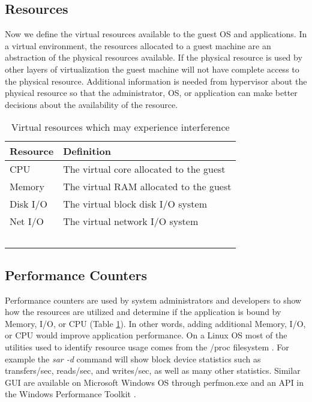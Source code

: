 \subsection{Resources}
Now we define the virtual resources available to the guest OS and applications.
In a virtual environment, the resources allocated to a guest machine are an abstraction of the physical resources available.  
If the physical resource is used by other layers of virtualization the guest machine will not have complete access to the physical resource.    
Additional information is needed from hypervisor about the physical resource so that the administrator, OS, or application can make better decisions about the availability of the resource. 

\begin{table}[h]
  \begin{tabular}{ l p{10cm} }
    Resource & Definition \\
    \hline
    CPU & The virtual core allocated to the guest \\
    Memory & The virtual RAM allocated to the guest \\
    Disk I/O & The virtual block disk I/O system \\
    Net I/O & The virtual network I/O system \\
    \hline
  \end{tabular}
\caption{Virtual resources which may experience interference}
\label{tab:resources}
\end{table}

\subsection{Performance Counters}
Performance counters are used by system administrators and developers to show how the resources are utilized and determine if the application is bound by Memory, I/O, or CPU (Table \ref{tab:resources}).  
In other words, adding additional Memory, I/O, or CPU would improve application performance. 
On a Linux OS most of the utilities used to identify resource usage comes from the /proc filesystem \cite{proc}. 
For example the \emph{sar -d} command will show block device statistics such as transfers/sec, reads/sec, and writes/sec, as well as many other statistics.  
Similar GUI are available on Microsoft Windows OS through perfmon.exe and an API in the Windows Performance Toolkit \cite{winperf}. 

